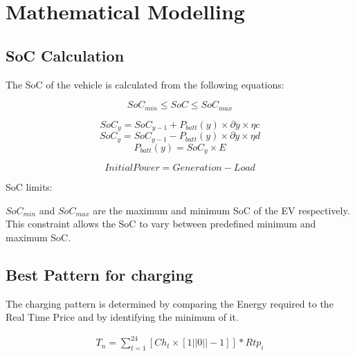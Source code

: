 	\chapter{Mathematical Modelling}
	\label{chap:mathmodel}
	
	\section{SoC Calculation}
	
	
		
	The SoC of the vehicle is calculated from the following equations:
	

			\begin{equation}
		                             SoC_{min} \leq SoC \leq SoC_{max}\label{eq:socminmax}
		    \end{equation}

		    \begin{equation}                         
		               SoC_{y} = SoC_{y-1} + P_{batt}(y) \times \partial y \times \eta c
			\end{equation}
		    \begin{equation}             
		               SoC_{y} = SoC_{y-1} - P_{batt}(y) \times \partial y \times \eta d
			\end{equation}
		    \begin{equation}             
		               P_{batt}(y) = SoC_{y} \times E
		    \end{equation}
		 
\begin{equation}             
	 Initial Power = Generation - Load
\end{equation}

	  SoC limits:  
	 
	   $SoC_{min}$ and $SoC_{max}$ are  the maximum and minimum SoC of the EV respectively.
	   This constraint allows the SoC to vary between predefined minimum and maximum SoC.               
	
	\section{Best Pattern for charging}
	
	
	The charging pattern is determined by comparing the Energy required to the Real Time Price and by  identifying the minimum of it. 
	
	\begin{equation}
		\begin{split}
				T_{n} = \sum_{t=1}^{24} [Ch_{t} \times [1 || 0 || -1 ] ] \ast  Rtp_{i} 
		\end{split}
    \end{equation}	 
